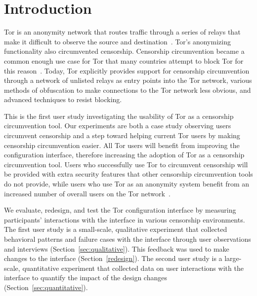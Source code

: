 \documentclass[USenglish,oneside,twocolumn]{article}
\begin{document}


\maketitle

\section{Introduction}


Tor is an anonymity network that routes traffic through a series of relays
that make it difficult to observe the source and destination~\cite{dingledine2004tor}. Tor's anonymizing functionality also circumvented censorship. Censorship circumvention became a common enough use case for Tor that many countries attempt to block Tor for this reason~\cite{winter2012great}. Today, Tor explicitly provides support for censorship circumvention through a network of unlisted relays as entry points into the Tor network, various methods of obfuscation to make connections to the Tor network less obvious, and advanced techniques to resist blocking.
 
This is the first user study investigating the usability of Tor as a censorship circumvention tool. Our experiments are both a case study observing users circumvent censorship and a step toward helping current Tor users by making censorship circumvention easier. All Tor users will benefit from improving the configuration interface, therefore increasing the adoption of Tor as a censorship circumvention tool. Users who successfully use Tor to circumvent censorship will be provided with extra security features that other censorship circumvention tools do not provide, while users who use Tor as an anonymity system benefit from an increased number of overall users on the Tor network~\cite{dingledine2006anonymity}.

We evaluate, redesign, and test the Tor configuration interface by
measuring participants' interactions with the interface in various censorship environments.
The first user study is a small-scale, qualitative experiment that collected 
behavioral patterns and failure cases with the interface through user observations
and interviews (Section~\ref{sec:qualitative}). This feedback was used to make changes to the interface (Section~\ref{redesign}). The second user study is a large-scale, quantitative experiment
that collected data on user interactions with the interface to quantify the impact of the design changes (Section~\ref{sec:quantitative}).
\end{document}
